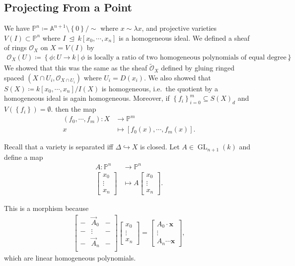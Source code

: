 \hypertarget{projecting-from-a-point}{%
\subsection{Projecting From a Point}\label{projecting-from-a-point}}

We have
\({\mathbb{P}}^n \coloneqq{\mathbb{A}}^{n+1}\setminus\left\{{0}\right\}/ \sim\)
where \(x\sim \lambda x\), and projective varieties
\(V(I) \subset {\mathbb{P}}^n\) where
\(I {~\trianglelefteq~}k[x_0, \cdots, x_n]\) is a homogeneous ideal. We
defined a sheaf of rings \({\mathcal{O}}_X\) on \(X = V(I)\) by
\begin{align*}  
{\mathcal{O}}_X(U) \coloneqq\left\{{\phi: U\to k {~\mathrel{\Big|}~}\phi \text{ is locally a ratio of two homogeneous polynomials of equal degree}}\right\}
.\end{align*}
We showed that this was the same as the sheaf \(\tilde {\mathcal{O}}_X\)
defined by gluing ringed spaced
\((X \cap U_i, {\mathcal{O}}_{X\cap U_i})\) where \(U_i = D(x_i)\). We
also showed that \(S(X) \coloneqq k[x_0, \cdots, x_n] / I(X)\) is
homogeneous, i.e.~the quotient by a homogeneous ideal is again
homogeneous. Moreover, if
\(\left\{{f_i}\right\}_{i=0}^m \subseteq S(X)_d\) and
\(V(\left\{{f_i}\right\}) = \emptyset\). then the map
\begin{align*}  
(f_0, \cdots, f_m): X &\to {\mathbb{P}}^m \\
x &\mapsto [f_0(x), \cdots, f_m(x)]
.\end{align*}

Recall that a variety is separated iff \(\Delta \hookrightarrow X\) is
closed. Let \(A\in \operatorname{GL}_{n+1}(k)\) and define a map
\begin{align*}  
A: {\mathbb{P}}^n &\to {\mathbb{P}}^n \\
\begin{bmatrix}
x_0  \\
\vdots \\
x_n 
\end{bmatrix}
&\mapsto
A
\begin{bmatrix}
x_0  \\
\vdots \\
x_n 
\end{bmatrix}
.\end{align*}

This is a morphism because
\begin{align*}  
\begin{bmatrix}
- & \vec A_0 & - \\
- & \vdots & - \\
- & \vec A_n & - \\
\end{bmatrix}
\begin{bmatrix}
x_0  \\
\vdots \\
x_n 
\end{bmatrix}
=
\begin{bmatrix}
A_0 \cdot \mathbf{x}  \\
\vdots \\
A_n \cdots \mathbf{x} 
\end{bmatrix}
,\end{align*}
which are linear homogeneous polynomials.

